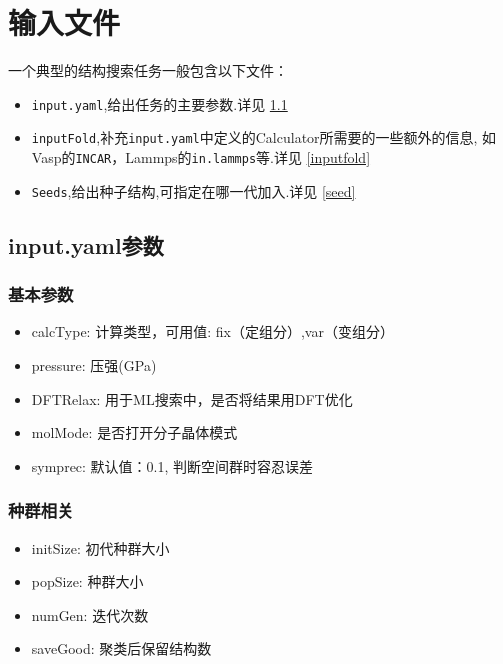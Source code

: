 \documentclass[12pt]{article}
\newcommand{\file}[1]{\texttt{#1}}
\begin{document}
\section{输入文件}
一个典型的结构搜索任务一般包含以下文件：
\begin{itemize}
    \item \file{input.yaml},给出任务的主要参数.详见 \ref{inputpara}
    \item \file{inputFold},补充\file{input.yaml}中定义的Calculator所需要的一些额外的信息,
    如Vasp的\file{INCAR}，Lammps的\file{in.lammps}等.详见 \ref{inputfold}
    \item \file{Seeds},给出种子结构,可指定在哪一代加入.详见 \ref{seed}
\end{itemize}
\subsection{input.yaml参数} \label{inputpara}

\subsubsection{基本参数}
\begin{itemize}
    \item calcType: 计算类型，可用值:  fix（定组分）,var（变组分）
    \item pressure: 压强(GPa)
    \item DFTRelax: 用于ML搜索中，是否将结果用DFT优化
    \item molMode: 是否打开分子晶体模式
    \item symprec: 默认值：0.1, 判断空间群时容忍误差
\end{itemize}

\subsubsection{种群相关}
\begin{itemize}
    \item initSize: 初代种群大小
    \item popSize: 种群大小
    \item numGen: 迭代次数
    \item saveGood: 聚类后保留结构数
\end{itemize}
\end{document}
